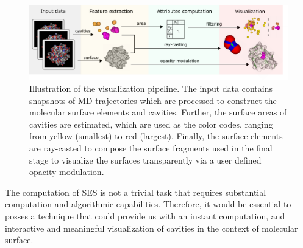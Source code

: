 \begin{figure}[tb]
  \centering
  \includegraphics[width=\textwidth]{image/overview.pdf}
  \caption{Illustration of the visualization pipeline. The input data contains snapshots of MD trajectories which are processed to construct the molecular surface elements and cavities. Further, the surface areas of cavities are estimated, which are used as the color codes, ranging from yellow (smallest) to red (largest). Finally, the surface elements are ray-casted to compose the surface fragments used in the final stage to visualize the surfaces transparently via a user defined opacity modulation.}
	\label{fig:overview}
\end{figure}

The computation of SES is not a trivial task that requires substantial computation and algorithmic capabilities. 
Therefore, it would be essential to posses a technique that could provide us with an instant computation, and interactive and meaningful visualization of cavities in the context of molecular surface.


